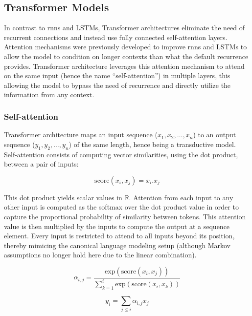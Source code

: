 \documentclass[letterpaper, 12pt]{report}
\begin{document}
\subsection{Transformer Models}
\label{sec:bg_transformers}

In contrast to \acrshort{rnn}s and LSTMs, Transformer \citep{vaswani2017} architectures eliminate the need of recurrent connections and instead use fully connected self-attention layers. Attention mechanisms \citep{bahdanau2014neural} were previously developed to improve \acrshort{rnn}s and LSTMs to allow the model to condition on longer contexts than what the default recurrence provides. Transformer architecture leverages this attention mechanism to attend on the same input (hence the name ``self-attention'') in multiple layers, this allowing the model to bypass the need of recurrence and directly utilize the information from any context.

\subsubsection{Self-attention}

Transformer architecture maps an input sequence ($x_{1}, x_{2}, \ldots, x_{n}$) to an output sequence ($y_{1}, y_{2}, \ldots, y_{n}$) of the same length, hence being a transductive model. Self-attention consists of computing vector similarities, using the dot product, between a pair of inputs:

\begin{equation}
  \text{score}(x_{i},x_{j}) = x_{i}.x_{j}
\end{equation}

This dot product yields scalar values in $\mathbb{R}$. Attention from each input to any other input is computed as the softmax over the dot product value in order to capture the proportional probability of similarity between tokens. This attention value is then multiplied by the inputs to compute the output at a sequence element. Every input is restricted to attend to all inputs beyond its position, thereby mimicing the canonical language modeling setup (although Markov assumptions no longer hold here due to the linear combination).

\begin{equation}
  \alpha_{i,j} = \frac{\text{exp}(\text{score}(x_{i},x_{j}))}{\sum_{k=1}^{i}\text{exp}(\text{score}(x_{i},x_{k}))}
\end{equation}

\begin{equation}
  y_{i} = \sum_{j \le i}\alpha_{i,j}x_{j}
\end{equation}
\end{document}
